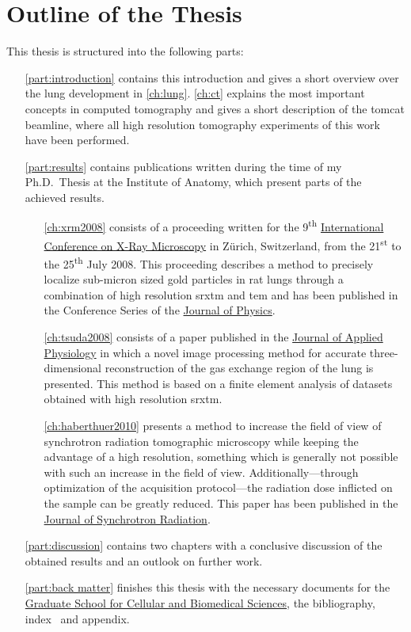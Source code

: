 \section{Outline of the Thesis}
This thesis is structured into the following parts:
\begin{itemize}
	\item [\autoref{part:introduction}] contains this introduction and gives a short overview over the lung development in \autoref{ch:lung}. \autoref{ch:ct} explains the most important concepts in computed tomography and gives a short description of the \ac{tomcat} beamline, where all high resolution tomography experiments of this work have been performed.
	\item [\autoref{part:results}] contains publications written during the time of my Ph.D.\ Thesis at the Institute of Anatomy, which present parts of the achieved results.
	\begin{itemize}
		\item [\autoref{ch:xrm2008}] consists of a proceeding written for the 9\textsuperscript{th} \href{http://xrm2008.web.psi.ch/}{International Conference on X-Ray Microscopy} in Zürich, Switzerland, from the 21\textsuperscript{st} to the 25\textsuperscript{th} July 2008. This proceeding describes a method to precisely localize sub-micron sized gold particles in rat lungs through a combination of high resolution \acl{srxtm} and \acl{tem} and has been published in the Conference Series of the \href{http://iopscience.iop.org/1742-6596/}{Journal of Physics}.
		
		\item [\autoref{ch:tsuda2008}] consists of a paper published in the \href{http://jap.physiology.org/}{Journal of Applied Physiology} in which a novel image processing method for accurate three-dimensional reconstruction of the gas exchange region of the lung is presented. This method is based on a finite element analysis of datasets obtained with high resolution \acl{srxtm}.

		\item [\autoref{ch:haberthuer2010}] presents a method to increase the field of view of synchrotron radiation tomographic microscopy while keeping the advantage of a high resolution, something which is generally not possible with such an increase in the field of view. Additionally---through optimization of the acquisition protocol---the radiation dose inflicted on the sample can be greatly reduced. This paper has been published in the \href{http://journals.iucr.org/s/}{Journal of Synchrotron Radiation}.
	\end{itemize}
	\item [\autoref{part:discussion}] contains two chapters with a conclusive discussion of the obtained results and an outlook on further work.
	\item [\autoref{part:back matter}] finishes this thesis with the necessary documents for the \href{http://www.gcb.unibe.ch}{Graduate School for Cellular and Biomedical Sciences}, the bibliography, index~ and appendix.
\end{itemize}